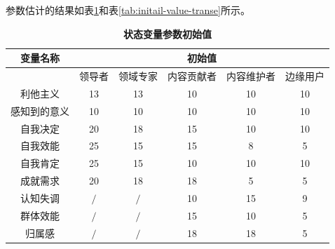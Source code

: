 参数估计的结果如表\ref{tab:initail-value-level}和表\ref{tab:initail-value-transe}所示。
\begin{table}[!htbp]
  \centering
\small
  \caption{\small{\textbf{状态变量参数初始值}}}
\begin{tabular}{|c|c|c|c|c|c|}
\hline
\multicolumn{ 1}{|c|}{变量名称} &                                     \multicolumn{ 5}{|c|}{初始值} \\
\hline
\multicolumn{ 1}{|c|}{} &        领导者 &       领域专家 &      内容贡献者 &      内容维护者 &       边缘用户 \\
\hline
      利他主义 &      13      &        13    &        10    &   10         &      10      \\
\hline
    感知到的意义 &      10      &     10       &     10       &   10         &      10      \\
\hline
      自我决定 &      20      &     18       &      15      &          10  &    10        \\
\hline
      自我效能 &     25       &      15      &        15    &        8    &       5     \\
\hline
      自我肯定 &      25      &    15        &     10       &      10      &       10     \\
\hline
      成就需求 &     20       &     18       &      18      &      5      &        5    \\
\hline
      认知失调 &     $\slash$       &       $\slash$       &      10      &       15     &      9      \\
\hline
      群体效能 &     $\slash$         &          $\slash$    &    15        &      10      &       5     \\
\hline
       归属感 &       $\slash$       &     $\slash$         &      18      &        18    &        5    \\\hline
\end{tabular}  


  \label{tab:initail-value-level}
\end{table}

